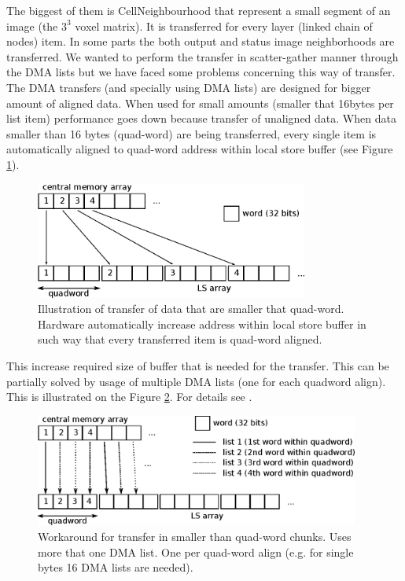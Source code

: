 \par
The biggest of them is CellNeighbourhood that represent a small segment of an image (the $3^3$ voxel matrix).
It is transferred for every layer (linked chain of nodes) item.
In some parts the both output and status image neighborhoods are transferred.
We wanted to perform the transfer in scatter-gather manner through the DMA lists but we have faced some problems concerning this way of transfer.
The DMA transfers (and specially using DMA lists) are designed for bigger amount of aligned data.
When used for small amounts (smaller that 16bytes per list item) performance goes down because transfer of unaligned data.
When data smaller than 16 bytes (quad-word) are being transferred, every single item is automatically aligned to quad-word address within local store buffer (see Figure \ref{fg:automaticAlignOfSmallData}).

\begin{figure}
    \centering
    \includegraphics[width=0.8\textwidth]{data/automaticAlignOfSmallData}
    \caption[Automatic align of small data]
{
  Illustration of transfer of data that are smaller that quad-word.
  Hardware automatically increase address within local store buffer in such way that every transferred item is quad-word aligned.
}
    \label{fg:automaticAlignOfSmallData}
\end{figure}

This increase required size of buffer that is needed for the transfer.
This can be partially solved by usage of multiple DMA lists (one for each quadword align).
This is illustrated on the Figure \ref{fg:multipleDMAList}.
For details see \cite{DMAListIssues}.

\begin{figure}
    \centering
    \includegraphics[width=0.95\textwidth]{data/multipleDMAList}
    \caption[Multiple DMA list workaround]
{
  Workaround for transfer in smaller than quad-word chunks.
  Uses more that one DMA list.
  One per quad-word align (e.g. for single bytes 16 DMA lists are needed).
}
    \label{fg:multipleDMAList}
\end{figure}

